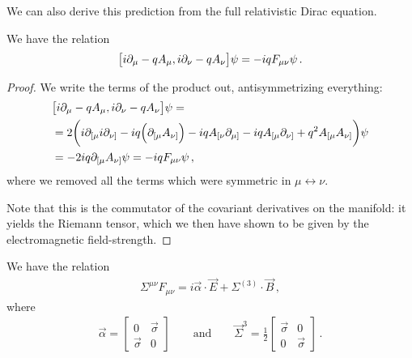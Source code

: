 \documentclass[main.tex]{subfiles}
\begin{document}
\begin{claim}
We can also derive this prediction from the full relativistic Dirac equation.
\end{claim}

\begin{claim}
We have the relation 
%
\begin{align}
\qty[i \partial_{\mu } - q A_{\mu }, i \partial_{\nu } - q A_{\nu }] \psi 
= -iq F_{\mu \nu } \psi 
\,.
\end{align}
\end{claim}

\begin{proof}
We write the terms of the product out, antisymmetrizing everything: 
%
\begin{align}
&\qty[i \partial_{\mu } - q A_{\mu }, i \partial_{\nu } - q A_{\nu }] \psi = \\
&=2 \qty(i \partial_{[\mu }i \partial_{\nu ]}
- i q \qty(\partial_{[\mu } A_{\nu ]} ) 
-iq A_{[\nu } \partial_{\mu ]}
-iq A_{[\mu } \partial_{\nu ]}
+ q^2 A_{[\mu } A_{\nu ]}) \psi   \\
&= -2iq \partial_{[\mu } A_{\nu ]} \psi 
= -iq F_{\mu \nu } \psi 
\,,
\end{align}
%
where we removed all the terms which were symmetric in \(\mu \leftrightarrow \nu \). 

Note that this is the commutator of the covariant derivatives on the manifold: it yields the Riemann tensor, which we then have shown to be given by the electromagnetic field-strength.
\end{proof}

\begin{claim}
We have the relation 
%
\begin{align}
\Sigma^{\mu \nu }F_{\mu \nu }
=i \vec{\alpha} \cdot \vec{E} + \Sigma^{(3)} \cdot \vec{B}
\,,
\end{align}
%
where 
%
\begin{align}
\vec{\alpha} = \left[\begin{array}{cc}
0 & \vec{\sigma} \\ 
\vec{\sigma} & 0
\end{array}\right] 
\qquad \text{and} \qquad
\vec{\Sigma}^{3} = \frac{1}{2} \left[\begin{array}{cc}
\vec{\sigma} & 0 \\ 
0 & \vec{\sigma}
\end{array}\right]
\,.
\end{align}
\end{claim}
\end{document}
